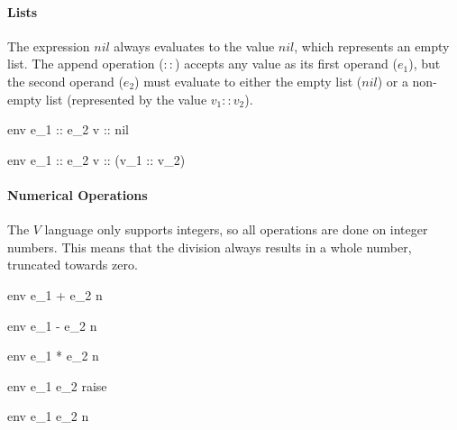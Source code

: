 \documentclass{article}
\begin{document}
\paragraph{Lists}
The expression $nil$ always evaluates to the value $nil$, which represents an empty list.
The append operation ($::$) accepts any value as its first operand ($e_1$), but the second operand ($e_2$) must evaluate to either the empty list ($nil$) or a non-empty list (represented by the value $v_1 :: v_2$).


    {\mbox{env} \vdash e_1 :: e_2 \Downarrow v :: nil}

    {\mbox{env} \vdash e_1 :: e_2 \Downarrow v :: (v_1 :: v_2)}


\paragraph{Numerical Operations}
The $V$ language only supports integers, so all operations are done on integer numbers.
This means that the division always results in a whole number, truncated towards zero.

\medskip

    {\mbox{env} \vdash e_1 + e_2 \Downarrow n}

    {\mbox{env} \vdash e_1 - e_2 \Downarrow n}

    {\mbox{env} \vdash e_1 * e_2 \Downarrow n}

    {\mbox{env} \vdash e_1 \div e_2 \Downarrow raise}

    {\mbox{env} \vdash e_1 \div e_2 \Downarrow n}
\end{document}
